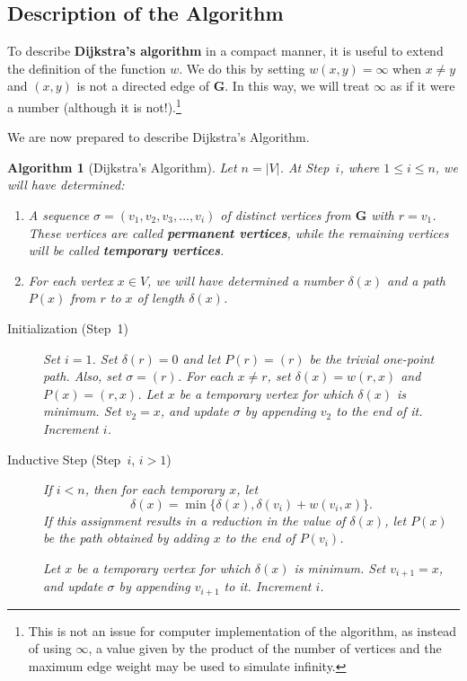\documentclass[10pt,]{book}
\newcommand{\terminology}[1]{\textbf{#1}}
\theoremstyle{plain}
\newtheorem{algorithm}[theorem]{Algorithm}
\theoremstyle{definition}
\theoremstyle{definition}
\theoremstyle{definition}
\theoremstyle{definition}
\numberwithin{equation}{section}
\newcommand{\bfG}{\mathbf{G}}
\newcommand{\lt}{<}
\begin{document}
\subsection[{Description of the Algorithm}]{Description of the Algorithm}\label{subsection-23}
\hypertarget{p-198}{}%
To describe \terminology{Dijkstra's algorithm} in a compact manner, it is useful to extend the definition of the function \(w\). We do this by setting \(w(x,y)=\infty\) when \(x\neq y\) and \((x,y)\) is not a directed edge of \(\bfG\). In this way, we will treat \(\infty\) as if it were a number (although it is not!).\footnote{This is not an issue for computer implementation of the algorithm, as instead of using \(\infty\), a value given by the product of the number of vertices and the maximum edge weight may be used to simulate infinity.\label{fn-1}}%
\par
\hypertarget{p-199}{}%
We are now prepared to describe Dijkstra's Algorithm.%
\begin{algorithm}[{Dijkstra's Algorithm}]\label{alg_dijkstra}
\hypertarget{p-200}{}%
Let \(n=|V|\). At Step~\(i\), where \(1\le i\le n\), we will have determined: \leavevmode%
\begin{enumerate}
\item\hypertarget{li-47}{}\hypertarget{p-201}{}%
A sequence \(\sigma=(v_1,v_2,v_3,\dots,v_i)\) of distinct vertices from \(\bfG\) with \(r=v_1\).  These vertices are called \terminology{permanent vertices}, while the remaining vertices will be called \terminology{temporary vertices}.%
\item\hypertarget{li-48}{}\hypertarget{p-202}{}%
For each vertex \(x\in V\), we will have determined a number \(\delta(x)\) and a path \(P(x)\) from \(r\) to \(x\) of length \(\delta(x)\).%
\end{enumerate}
 \leavevmode%
\begin{description}
\item[{Initialization (Step~1)}]\hypertarget{li-49}{}\hypertarget{p-203}{}%
Set \(i=1\). Set \(\delta(r)=0\) and let \(P(r)=(r)\) be the trivial one-point path. Also, set \(\sigma= (r)\). For each \(x\neq r\), set \(\delta(x)= w(r,x)\) and \(P(x)=(r,x)\). Let \(x\) be a temporary vertex for which \(\delta(x)\) is minimum. Set \(v_2 = x\), and update \(\sigma\) by appending \(v_2\) to the end of it. Increment \(i\).%
\item[{Inductive Step (Step~\(i\), \(i>1\))}]\hypertarget{li-50}{}\hypertarget{p-204}{}%
If \(i\lt n\), then for each temporary \(x\), let%
\begin{equation*}
\delta(x) = \min\{\delta(x), \delta(v_i)+w(v_i,x)\}.
\end{equation*}
If this assignment results in a reduction in the value of \(\delta(x)\), let \(P(x)\) be the path obtained by adding \(x\) to the end of \(P(v_i)\).%
\par
\hypertarget{p-205}{}%
Let \(x\) be a temporary vertex for which \(\delta(x)\) is minimum. Set \(v_{i+1}=x\), and update \(\sigma\) by appending \(v_{i+1}\) to it. Increment \(i\).%
\end{description}
%
\end{algorithm}
\end{document}

